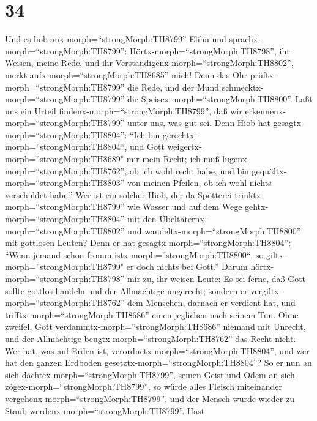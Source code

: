 \hypertarget{section-33}{%
\section{34}\label{section-33}}

 Und es hob anx-morph=``strongMorph:TH8799'' Elihu und
sprachx-morph=``strongMorph:TH8799'': 
Hörtx-morph=``strongMorph:TH8798'', ihr Weisen, meine Rede, und ihr
Verständigenx-morph=``strongMorph:TH8802'', merkt
aufx-morph=``strongMorph:TH8685'' mich!  Denn das Ohr
prüftx-morph=``strongMorph:TH8799'' die Rede, und der Mund
schmecktx-morph=``strongMorph:TH8799'' die
Speisex-morph=``strongMorph:TH8800''.  Laßt uns ein Urteil
findenx-morph=``strongMorph:TH8799'', daß wir
erkennenx-morph=``strongMorph:TH8799'' unter uns, was gut sei.
 Denn Hiob hat gesagtx-morph=``strongMorph:TH8804'': ``Ich
bin gerechtx-morph=''strongMorph:TH8804``, und Gott
weigertx-morph=''strongMorph:TH8689" mir mein Recht;  ich
muß lügenx-morph=``strongMorph:TH8762'', ob ich wohl recht habe, und bin
gequältx-morph=``strongMorph:TH8803'' von meinen Pfeilen, ob ich wohl
nichts verschuldet habe.''  Wer ist ein solcher Hiob, der da
Spötterei trinktx-morph=``strongMorph:TH8799'' wie Wasser 
und auf dem Wege gehtx-morph=``strongMorph:TH8804'' mit den
Übeltäternx-morph=``strongMorph:TH8802'' und
wandeltx-morph=``strongMorph:TH8800'' mit gottlosen Leuten? 
Denn er hat gesagtx-morph=``strongMorph:TH8804'': ``Wenn jemand schon
fromm istx-morph=''strongMorph:TH8800``, so
giltx-morph=''strongMorph:TH8799" er doch nichts bei Gott.''
 Darum hörtx-morph=``strongMorph:TH8798'' mir zu, ihr
weisen Leute: Es sei ferne, daß Gott sollte gottlos handeln und der
Allmächtige ungerecht;  sondern er
vergiltx-morph=``strongMorph:TH8762'' dem Menschen, darnach er verdient
hat, und trifftx-morph=``strongMorph:TH8686'' einen jeglichen nach
seinem Tun.  Ohne zweifel, Gott
verdammtx-morph=``strongMorph:TH8686'' niemand mit Unrecht, und der
Allmächtige beugtx-morph=``strongMorph:TH8762'' das Recht nicht.
 Wer hat, was auf Erden ist,
verordnetx-morph=``strongMorph:TH8804'', und wer hat den ganzen Erdboden
gesetztx-morph=``strongMorph:TH8804''?  So er nun an sich
dächtex-morph=``strongMorph:TH8799'', seinen Geist und Odem an sich
zögex-morph=``strongMorph:TH8799'',  so würde alles Fleisch
miteinander vergehenx-morph=``strongMorph:TH8799'', und der Mensch würde
wieder zu Staub werdenx-morph=``strongMorph:TH8799''.  Hast
